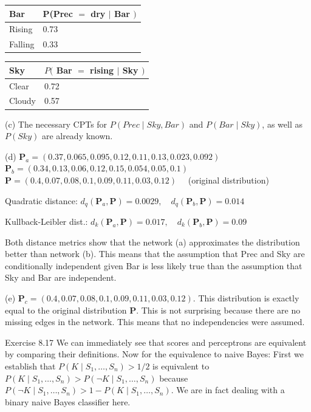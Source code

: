 \documentclass[10pt]{book}
\begin{document}
\begin{tabular}{ll} 
Bar & P(Prec $=$ dry $\mid$ Bar $)$ \\
\hline Rising & 0.73 \\
\hline Falling & 0.33 \\
\hline
\end{tabular}

\begin{tabular}{ll} 
Sky & $P($ Bar $=$ rising $\mid$ Sky $)$ \\
\hline Clear & 0.72 \\
\hline Cloudy & 0.57 \\
\hline
\end{tabular}

(c) The necessary CPTs for $P(P r e c \mid S k y, B a r)$ and $P(B a r \mid S k y)$, as well as $P(S k y)$ are already known.

(d) $\boldsymbol{P}_{a}=(0.37,0.065,0.095,0.12,0.11,0.13,0.023,0.092)$
$\boldsymbol{P}_{b}=(0.34,0.13,0.06,0.12,0.15,0.054,0.05,0.1)$
$\boldsymbol{P}=(0.4,0.07,0.08,0.1,0.09,0.11,0.03,0.12) \quad$ (original distribution)

Quadratic distance: $d_{q}\left(\boldsymbol{P}_{a}, \boldsymbol{P}\right)=0.0029, \quad d_{q}\left(\boldsymbol{P}_{b}, \boldsymbol{P}\right)=0.014$

Kullback-Leibler dist.: $d_{k}\left(\boldsymbol{P}_{a}, \boldsymbol{P}\right)=0.017, \quad d_{k}\left(\boldsymbol{P}_{b}, \boldsymbol{P}\right)=0.09$

Both distance metrics show that the network (a) approximates the distribution better than network (b). This means that the assumption that Prec and Sky are conditionally independent given Bar is less likely true than the assumption that Sky and Bar are independent.

(e) $\boldsymbol{P}_{c}=(0.4,0.07,0.08,0.1,0.09,0.11,0.03,0.12)$. This distribution is exactly equal to the original distribution $\boldsymbol{P}$. This is not surprising because there are no missing edges in the network. This means that no independencies were assumed.

Exercise 8.17 We can immediately see that scores and perceptrons are equivalent by comparing their definitions. Now for the equivalence to naive Bayes: First we establish that $P\left(K \mid S_{1}, \ldots, S_{n}\right)>1 / 2$ is equivalent to $P\left(K \mid S_{1}, \ldots, S_{n}\right)>P\left(\neg K \mid S_{1}, \ldots, S_{n}\right)$ because $P\left(\neg K \mid S_{1}, \ldots, S_{n}\right)>1-P\left(K \mid S_{1}, \ldots, S_{n}\right)$. We are in fact dealing with a binary naive Bayes classifier here.
\end{document}
